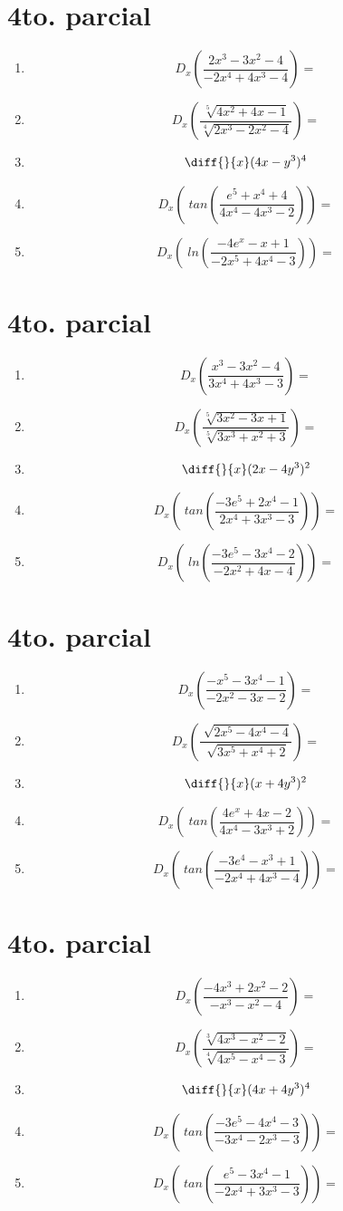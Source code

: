 \documentclass[oneside,spanish,letter]{article}
\begin{document}
\section{4to. parcial}
\begin{enumerate}
 \item $$ D_x \left( \frac{2x^3-3x^2-4}{-2x^4+4x^3-4}\right)=$$
 \item $$ D_x \left( \frac{\sqrt[5]{4x^2+4x-1}}{\sqrt[4]{2x^3-2x^2-4}}\right)=$$
\item $$\diff{}{x}(4x-y^3)^4$$
 \item $$ D_x \left(\;tan\left( \frac{e^5+x^4+4}{4x^4-4x^3-2}\right)\right)=$$
 \item $$ D_x \left(\;ln\left( \frac{-4e^x-x+1}{-2x^5+4x^4-3}\right)\right)=$$
 \end{enumerate}
  \newpage
\section{4to. parcial}
\begin{enumerate}
 \item $$ D_x \left( \frac{x^3-3x^2-4}{3x^4+4x^3-3}\right)=$$
 \item $$ D_x \left( \frac{\sqrt[5]{3x^2-3x+1}}{\sqrt[5]{3x^3+x^2+3}}\right)=$$
\item $$\diff{}{x}(2x-4y^3)^2$$
 \item $$ D_x \left(\;tan\left( \frac{-3e^5+2x^4-1}{2x^4+3x^3-3}\right)\right)=$$
 \item $$ D_x \left(\;ln\left( \frac{-3e^5-3x^4-2}{-2x^2+4x-4}\right)\right)=$$
 \end{enumerate}
  \newpage
\section{4to. parcial}
\begin{enumerate}
 \item $$ D_x \left( \frac{-x^5-3x^4-1}{-2x^2-3x-2}\right)=$$
 \item $$ D_x \left( \frac{\sqrt[]{2x^5-4x^4-4}}{\sqrt[]{3x^5+x^4+2}}\right)=$$
\item $$\diff{}{x}(x+4y^3)^2$$
 \item $$ D_x \left(\;tan\left( \frac{4e^x+4x-2}{4x^4-3x^3+2}\right)\right)=$$
 \item $$ D_x \left(\;tan\left( \frac{-3e^4-x^3+1}{-2x^4+4x^3-4}\right)\right)=$$
 \end{enumerate}
  \newpage
\section{4to. parcial}
\begin{enumerate}
 \item $$ D_x \left( \frac{-4x^3+2x^2-2}{-x^3-x^2-4}\right)=$$
 \item $$ D_x \left( \frac{\sqrt[3]{4x^3-x^2-2}}{\sqrt[4]{4x^5-x^4-3}}\right)=$$
\item $$\diff{}{x}(4x+4y^3)^4$$
 \item $$ D_x \left(\;tan\left( \frac{-3e^5-4x^4-3}{-3x^4-2x^3-3}\right)\right)=$$
 \item $$ D_x \left(\;tan\left( \frac{e^5-3x^4-1}{-2x^4+3x^3-3}\right)\right)=$$
 \end{enumerate}
  \newpage
\end{document}
